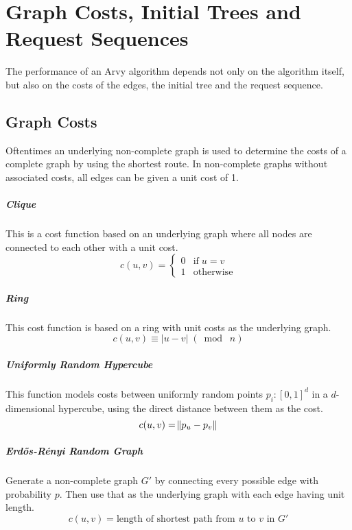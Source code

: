 \documentclass[a4paper, oneside]{discothesis}
\begin{document}
\chapter{Graph Costs, Initial Trees and Request Sequences}

The performance of an Arvy algorithm depends not only on the algorithm itself, but also on the costs of the edges, the initial tree and the request sequence.

\section{Graph Costs}

Oftentimes an underlying non-complete graph is used to determine the costs of a complete graph by using the shortest route. In non-complete graphs without associated costs, all edges can be given a unit cost of 1.

\paragraph{Clique} This is a cost function based on an underlying graph where all nodes are connected to each other with a unit cost.
\begin{equation}
c(u,v)=
\begin{cases}
0 & \text{if}\;u=v \\
1 & \text{otherwise}
\end{cases}
\end{equation}

\paragraph{Ring} This cost function is based on a ring with unit costs as the underlying graph.
\begin{equation}
c(u,v)\equiv|u-v|\;(\bmod\;n)
\end{equation}

\paragraph{Uniformly Random Hypercube} This function models costs between uniformly random points $p_i:[0,1]^d$ in a $d$-dimensional hypercube, using the direct distance between them as the cost.
\begin{equation}
c(u,v)=\norm{p_u-p_v}
\end{equation}

\paragraph{Erdős-Rényi Random Graph} Generate a non-complete graph $G'$ by connecting every possible edge with probability $p$. Then use that as the underlying graph with each edge having unit length.
\begin{equation}
c(u,v)=\text{length of shortest path from $u$ to $v$ in $G'$}
\end{equation}
\end{document}
